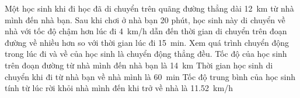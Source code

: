 \begin{ex}
	
	\loigiai{}
\end{ex}
\begin{ex}
	Một học sinh khi đi học đã di chuyển trên quãng đường thẳng dài \SI{12}{\kilo\meter} từ nhà mình đến nhà bạn. Sau khi chơi ở nhà bạn 20 phút, học sinh này di chuyển về nhà với tốc độ chậm hơn lúc đi \SI{4}{\kilo\meter/\hour} dẫn đến thời gian di chuyển trên đoạn đường về nhiều hơn so với thời gian lúc đi \SI{15}{\minute}. Xem quá trình chuyển động trong lúc đi và về của học sinh là chuyển động thẳng đều.
	{Tốc độ của học sinh trên đoạn đường từ nhà mình đến nhà bạn là \SI{14}{\kilo\meter}}
	{\True Thời gian học sinh di chuyển khi đi từ nhà bạn về nhà mình là \SI{60}{\minute}}
	{\True Tốc độ trung bình của học sinh tính từ lúc rời khỏi nhà mình đến khi trở về nhà là \SI{11.52}{\kilo\meter/\hour}}
	\loigiai{}
\end{ex}
